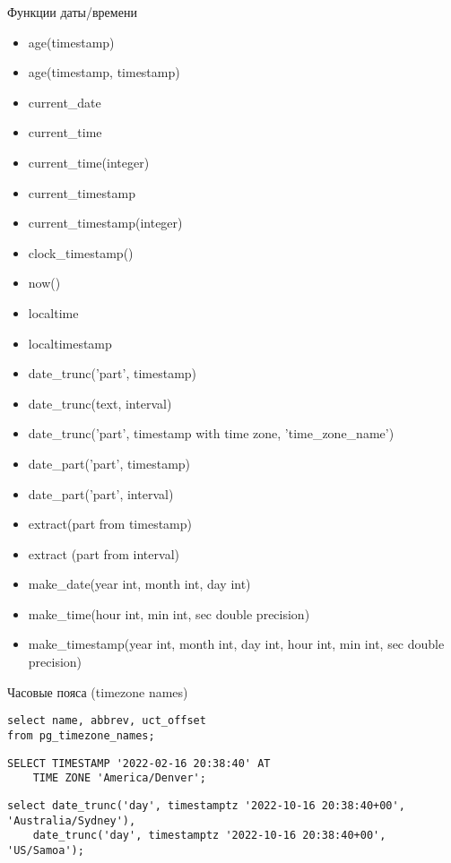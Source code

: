 \documentclass[12pt]{article}
\begin{document}
\begin{nota}{Функции даты/времени}
    \begin{itemize}
        \item age(timestamp)
        \item age(timestamp, timestamp)
        \item current\_date
        \item current\_time 
        \item current\_time(integer)
        \item current\_timestamp
        \item current\_timestamp(integer)
        \item clock\_timestamp()
        \item now()
        \item localtime 
        \item localtimestamp
        \item date\_trunc('part', timestamp)
        \item date\_trunc(text, interval)
        \item date\_trunc('part', timestamp with time zone, 'time\_zone\_name')
        \item date\_part('part', timestamp)
        \item date\_part('part', interval)
        \item extract(part from timestamp)
        \item extract (part from interval)
        \item make\_date(year int, month int, day int)
        \item make\_time(hour int, min int, sec double precision)
        \item make\_timestamp(year int, month int, day int, hour int, min int, sec double precision)
    \end{itemize}
\end{nota}

\begin{Example}{Часовые пояса (timezone names)}
\begin{lstlisting}
select name, abbrev, uct_offset
from pg_timezone_names;
\end{lstlisting}

\begin{lstlisting}
SELECT TIMESTAMP '2022-02-16 20:38:40' AT 
    TIME ZONE 'America/Denver';
\end{lstlisting}

\begin{lstlisting}
select date_trunc('day', timestamptz '2022-10-16 20:38:40+00', 'Australia/Sydney'),
    date_trunc('day', timestamptz '2022-10-16 20:38:40+00', 'US/Samoa');
\end{lstlisting}
\end{Example}
\end{document}
